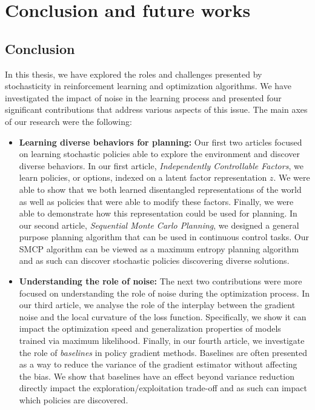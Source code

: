  \chapter*{Conclusion and future works}

\section*{Conclusion}
In this thesis, we have explored the roles and challenges presented by
stochasticity in reinforcement learning and optimization algorithms. We have
investigated the impact of noise in the learning process and presented four significant contributions that address various aspects of this issue.
The main axes of our research were the following:

\begin{itemize}
    \item \textbf{Learning diverse behaviors for planning:}
        Our first two articles focused on learning stochastic policies able to
        explore the environment and discover diverse behaviors. In our first
        article, \emph{Independently Controllable Factors}, we learn policies,
        or options, indexed on a latent factor representation $z$. We were able
        to show that we both learned disentangled representations of the world
        as well as policies that were able to modify these factors. Finally, we
        were able to demonstrate how this representation could be used for
        planning.
        In our second article, \emph{Sequential Monte Carlo Planning}, we
        designed a general purpose planning algorithm that can be used in
        continuous control tasks. Our SMCP algorithm can be viewed as a maximum
        entropy planning algorithm and as such can discover stochastic policies
        discovering diverse solutions.
    \item \textbf{Understanding the role of noise:} The next two contributions
        were more focused on understanding the role of noise during the
        optimization process. In our third article, we analyse the role of the
        interplay between the gradient noise and the local curvature of the loss
        function. Specifically, we show it can impact the optimization speed and
        generalization properties of models trained via maximum likelihood.
        Finally, in our fourth article, we investigate the role of
        \emph{baselines} in policy gradient methods. Baselines are often
        presented as a way to reduce the variance of the gradient estimator
        without affecting the bias. We show that baselines have an effect beyond
        variance reduction directly impact the
        exploration/exploitation trade-off and as such can impact which policies
        are discovered.
\end{itemize}


